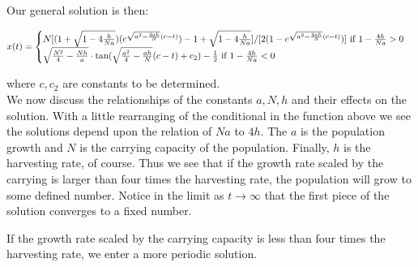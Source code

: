 \documentclass[12pt,letterpaper]{article}
\begin{document}
Our general solution is then:

$x(t)=\begin{cases}
N[(1+\sqrt{1-4{h\over Na}})(e^{\sqrt{a^2-{4ah\over N}}(c-t)})-1+\sqrt{1-4{h\over Na}}]/[2(1-e^{\sqrt{a^2-{4ah\over N}}(c-t)})] \textrm{ if } 1-{4h\over Na}>0\\

\sqrt{{N^2\over 4}-{Nh\over a}}\cdot \tan(\sqrt{{a^2\over 4}-{ah\over N}}(c-t)+c_2)-{1\over 2} \textrm{ if } 1-{4h\over Na}<0 \\
\end{cases}$

where $c,c_2$ are constants to be determined. \\

We now discuss the relationships of the constants $a,N,h$ and their effects on the solution. With a little rearranging of the conditional in the function above we see the solutions depend upon the relation of $Na$ to $4h$. The $a$ is the population growth and $N$ is the carrying capacity of the population. Finally, $h$ is the harvesting rate, of course. Thus we see that if the growth rate scaled by the carrying is larger than four times the harvesting rate, the population will grow to some defined number. Notice in the limit as $t\rightarrow \infty$ that the first piece of the solution converges to a fixed number.

If the growth rate scaled by the carrying capacity is less than four times the harvesting rate, we enter a more periodic solution. 
\end{document}
